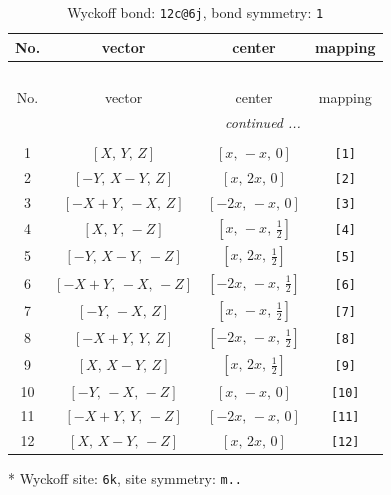 \documentclass[fleqn,8pt]{jsarticle}
\begin{document}
\begin{longtable}{cccc}
\caption{Wyckoff bond: {\tt 12c@6j}, bond symmetry: {\tt 1}}
 \\
 \hline \hline
No. & vector & center & mapping \\ \hline \endfirsthead

\multicolumn{3}{l}{\tablename\ \thetable{}} \\
 \hline \hline
No. & vector & center & mapping \\ \hline \endhead

 \hline \hline
\multicolumn{3}{r}{\footnotesize\it continued ...} \\ \endfoot

 \hline \hline
\multicolumn{3}{r}{} \\ \endlastfoot

1 & $\left[ X,\, Y,\, Z \right]$ & $\left[ x,\, - x,\, 0 \right]$ & {\tt [1]} \\ \hline
2 & $\left[ - Y,\, X - Y,\, Z \right]$ & $\left[ x,\, 2 x,\, 0 \right]$ & {\tt [2]} \\ \hline
3 & $\left[ - X + Y,\, - X,\, Z \right]$ & $\left[ - 2 x,\, - x,\, 0 \right]$ & {\tt [3]} \\ \hline
4 & $\left[ X,\, Y,\, - Z \right]$ & $\left[ x,\, - x,\, \frac{1}{2} \right]$ & {\tt [4]} \\ \hline
5 & $\left[ - Y,\, X - Y,\, - Z \right]$ & $\left[ x,\, 2 x,\, \frac{1}{2} \right]$ & {\tt [5]} \\ \hline
6 & $\left[ - X + Y,\, - X,\, - Z \right]$ & $\left[ - 2 x,\, - x,\, \frac{1}{2} \right]$ & {\tt [6]} \\ \hline
7 & $\left[ - Y,\, - X,\, Z \right]$ & $\left[ x,\, - x,\, \frac{1}{2} \right]$ & {\tt [7]} \\ \hline
8 & $\left[ - X + Y,\, Y,\, Z \right]$ & $\left[ - 2 x,\, - x,\, \frac{1}{2} \right]$ & {\tt [8]} \\ \hline
9 & $\left[ X,\, X - Y,\, Z \right]$ & $\left[ x,\, 2 x,\, \frac{1}{2} \right]$ & {\tt [9]} \\ \hline
10 & $\left[ - Y,\, - X,\, - Z \right]$ & $\left[ x,\, - x,\, 0 \right]$ & {\tt [10]} \\ \hline
11 & $\left[ - X + Y,\, Y,\, - Z \right]$ & $\left[ - 2 x,\, - x,\, 0 \right]$ & {\tt [11]} \\ \hline
12 & $\left[ X,\, X - Y,\, - Z \right]$ & $\left[ x,\, 2 x,\, 0 \right]$ & {\tt [12]} \\
\end{longtable}
* Wyckoff site: {\tt 6k}, site symmetry: {\tt m..}
\end{document}
